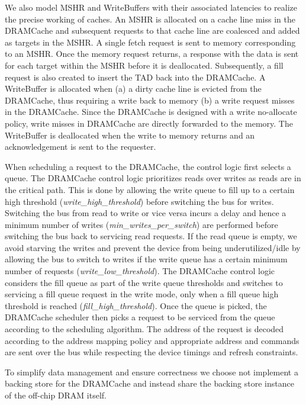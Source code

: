 \par We also model MSHR and WriteBuffers with their associated latencies to realize the precise working of caches. An MSHR is allocated on a cache line miss in the DRAMCache and subsequent requests to that cache line are coalesced and added as targets in the MSHR. A single fetch request is sent to memory corresponding to an MSHR. Once the memory request returns, a response with the data is sent for each target within the MSHR before it is deallocated. Subsequently, a fill request is also created to insert the TAD back into the DRAMCache. 
A WriteBuffer is allocated when (a) a dirty cache line is evicted from the DRAMCache, thus requiring a write back to memory (b) a write request misses in the DRAMCache. Since the DRAMCache is designed with a write no-allocate policy, write misses in DRAMCache are directly forwarded to the memory. The WriteBuffer is deallocated when the write to memory returns and an acknowledgement is sent to the requester. 
\par When scheduling a request to the DRAMCache, the control logic first selects a queue. The DRAMCache control logic prioritizes reads over writes as reads are in the critical path. This is done by allowing the write queue to fill up to a certain high threshold (\textit{write\_high\_threshold}) before switching the bus for writes. Switching the bus from read to write or vice versa incurs a delay and hence a minimum number of writes (\textit{min\_writes\_per\_switch}) are performed before switching the bus back to servicing read requests. If the read queue is empty, we avoid starving the writes and prevent the device from being underutilized/idle by allowing the bus to switch to writes if the write queue has a certain minimum number of requests (\textit{write\_low\_threshold}). The DRAMCache control logic considers the fill queue as part of the write queue thresholds and switches to servicing a fill queue request in the write mode, only when a fill queue high threshold is reached (\textit{fill\_high\_threshold}). Once the queue is picked, the DRAMCache scheduler then picks a request to be serviced from the queue according to the scheduling algorithm. The address of the request is decoded according to the  address mapping policy and appropriate address and commands are sent over the bus while respecting the device timings and refresh constraints.
\par To simplify data management and ensure correctness we choose not implement a backing store for the DRAMCache and instead share the backing store instance of the off-chip DRAM itself.

